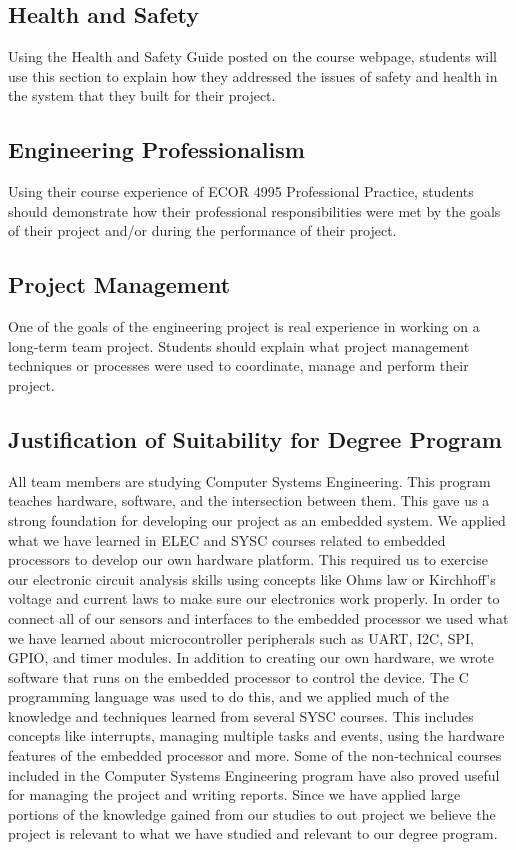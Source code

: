 \subsection{Health and Safety}

Using the Health and Safety Guide posted on the course webpage, students will 
use this section to explain how they addressed the issues of safety and health 
in the system that they built for their project.

\subsection{Engineering Professionalism}

Using their course experience of ECOR 4995 Professional Practice, students 
should demonstrate how their professional responsibilities were met by the 
goals of their project and/or during the performance of their project.

\subsection{Project Management}

One of the goals of the engineering project is real experience in working on a 
long-term team project. Students should explain what project management 
techniques or processes were used to coordinate, manage and perform their project.

\subsection{Justification of Suitability for Degree Program}

All team members are studying Computer Systems Engineering.  This program
teaches hardware, software, and the intersection between them.  This gave us a
strong foundation for developing our project as an embedded system.  We
applied what we have learned in ELEC and SYSC courses related to embedded
processors to develop our own hardware platform.  This required us to
exercise our electronic circuit analysis skills using concepts like Ohms law or
Kirchhoff’s voltage and current laws to make sure our electronics work
properly.  In order to connect all of our sensors and interfaces to the
embedded processor we used what we have learned about microcontroller
peripherals such as UART, I2C, SPI, GPIO, and timer modules.  In addition to 
creating our own hardware, we wrote software that runs on the embedded processor
to control the device.  The C programming language was used to do this, and we 
applied much of the knowledge and techniques learned from several SYSC courses.  
This includes concepts like interrupts, managing multiple tasks and events, 
using the hardware features of the embedded processor and more.  Some of the
non-technical courses included in the Computer Systems Engineering program have 
also proved useful for managing the project and writing reports.  Since we 
have applied large portions of the knowledge gained from our studies to
out project we believe the project is relevant to what we have studied and 
relevant to our degree program.

